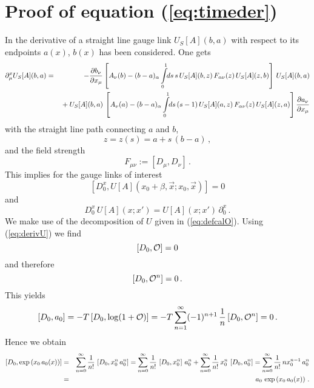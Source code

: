 \documentclass[a4paper,showpacs,showkeys,prd,nofootinbib]{revtex4}
\begin{document}
\section{Proof of equation (\ref{eq:timeder})}
\label{sec:proof}

In \cite{Elze:1986qd} the derivative of a straight line gauge link $U_S[A](b,a)$ 
with respect to its 
endpoints $a(x)$, $b(x)$ has been considered. One gets
\begin{eqnarray}
  \label{eq:elzeder}
\partial_\mu^x U_S[A](b,a) & = & - {\partial b_\nu \over \partial x_\mu}
\left[ A_\nu(b) - (b-a)_\alpha \int\limits_0^1 \!\! ds \, s \, U_S[A](b,z) \,
F_{\alpha\nu}(z) \, U_S[A](z,b) \right] \, U_S[A](b,a)
\nonumber \\ && {}
+ U_S[A](b,a) \, \left[ A_\nu(a) - (b-a)_\alpha \int\limits_0^1 \! \! ds \, (s-1) \,
U_S[A](a,z) \, F_{\alpha \nu}(z) \, U_S[A](z,a) \right] 
{\partial a_\nu \over \partial x_\mu}
\end{eqnarray}
with the straight line path connecting $a$ and $b$,
\begin{equation}
  \label{eq:defz}
z = z(s) = a + s \, (b-a)  \,,
\end{equation}
and the field strength
\begin{equation}
  \label{eq:deffieldstrength}
F_{\mu\nu} := [D_\mu,D_\nu]  \,.
\end{equation}
This implies for the gauge links of interest
\begin{equation}
  \label{eq:derivU}
\left[ D^x_0,U[A](x_0+\beta,\vec x;x_0,\vec x) \right] = 0
\end{equation}
and
\begin{equation}
  \label{eq:derivU2}
D^x_0 \, U[A](x;x') = U[A](x;x') \, \partial_0^x   \,.
\end{equation}
We make use of the decomposition of $U$ given in (\ref{eq:defcalO}). 
Using (\ref{eq:derivU}) we find
\begin{equation}
  \label{eq:commO}
\left[ D_0,{\cal O} \right] = 0
\end{equation}
and therefore
\begin{equation}
  \label{eq:commOn}
\left[ D_0,{\cal O}^n \right] = 0   \,.
\end{equation}
This yields
\begin{equation}
  \label{eq:comma0}
[D_0,a_0] = -T \, [D_0,\log(1+{\cal O})] 
= -T \sum\limits_{n=1}^\infty (-1)^{n+1} \, {1 \over n} \, [D_0,{\cal O}^n] = 0  \,.
\end{equation}
Hence we obtain
\begin{eqnarray}
\left[ D_0,\exp\left(x_0 \,a_0(x)\right) \right] & = & 
\sum\limits_{n=0}^\infty {1 \over n!} \, \left[D_0,x_0^n \, a_0^n \right]
= \sum\limits_{n=0}^\infty {1 \over n!} \, \left[D_0,x_0^n \right] \, a_0^n 
+ \sum\limits_{n=0}^\infty {1 \over n!} \, x_0^n \, \left[D_0,a_0^n \right]
= \sum\limits_{n=0}^\infty {1 \over n!} \, n x_0^{n-1} \, a_0^n 
\nonumber \\
  \label{eq:D0exp}
& = & a_0 \, \exp\left(x_0 \,a_0(x)\right)   \,.
\end{eqnarray}
\end{document}
